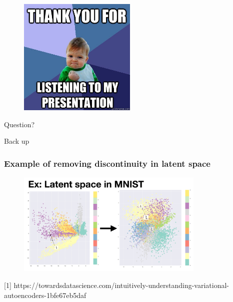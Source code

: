 \documentclass{beamer}
\begin{document}
\begin{frame}
    \begin{figure}
        \includegraphics[width=0.5\textwidth]{images/thankyou}
    \end{figure}
\end{frame}
\begin{frame}
\Huge{\centerline{Question?}}
\end{frame}

\begin{frame}
\Huge{\centerline{Back up}}
\end{frame}

\begin{frame}
\frametitle{Example of removing discontinuity in latent space}
\begin{figure}
    \includegraphics[width=0.8\textwidth]{images/latent_mnist}
\end{figure}
\tiny [1] https://towardsdatascience.com/intuitively-understanding-variational-autoencoders-1bfe67eb5daf
\end{frame}

\end{document}
